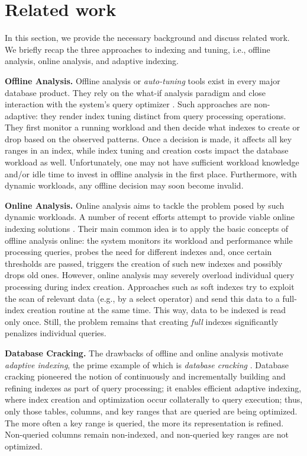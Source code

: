 \section{Related work}
\label{sec:related}

In this section, we provide the necessary background and discuss related work.
We briefly recap the three approaches to indexing and tuning, i.e.,
offline analysis, online analysis, and adaptive indexing.


\textbf{Offline Analysis.}
Offline analysis or {\em auto-tuning} tools exist
in every major database product. They rely on the what-if analysis
paradigm and close interaction with the system's query optimizer
\cite{CN:VLDB:97,FST88,H76,SHU:VLDB:2004,DB2DesignAdvisor}.
Such approaches are non-adaptive: they render index tuning distinct from query processing operations.
They first monitor a running workload
and then decide what indexes to create or drop based on the observed patterns.
Once a decision is made, it affects all key ranges in an index, while index tuning and
creation costs impact the database workload as well.
Unfortunately, one may not have sufficient workload knowledge
and/or idle time to invest in offline analysis in the first place.
Furthermore, with dynamic workloads, any offline decision
may soon become invalid.

\textbf{Online Analysis.}
Online analysis aims to tackle the problem posed by such dynamic workloads.
A number of recent efforts attempt to provide viable online indexing solutions
\cite{OnlineTuning, Colt, Tune, LSSS07}.
Their main common idea is to apply the basic concepts of offline analysis online:
the system monitors its workload and performance while processing queries,
probes the need for different indexes and, once certain thresholds are passed, triggers
the creation of such new indexes and possibly drops old ones.
However, online analysis may severely overload individual query processing during index creation.
Approaches such as soft indexes \cite{LSSS07} try to exploit
the scan of relevant data (e.g., by a select operator) and send this data to a full-index creation routine at the same time. This way, data to be indexed is read only once.
Still, the problem remains that creating {\em full} indexes significantly penalizes individual queries.

\textbf{Database Cracking.}
The drawbacks of offline and online analysis motivate {\em adaptive indexing},
the prime example of which is {\em database cracking} \cite{CrackingThesis}.
Database cracking pioneered the notion of continuously and incrementally building and refining
indexes as part of query processing;
it enables efficient adaptive indexing, where index creation and optimization
occur collaterally to query execution;
thus, only those tables, columns, and key ranges that are queried are being optimized.
The more often a key range is queried, the more its representation is refined.
Non-queried columns remain non-indexed, and non-queried key ranges are not optimized.

